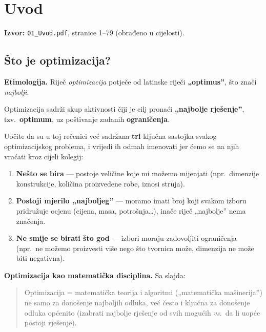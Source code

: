 \chapter{Uvod}
\label{ch:uvod}

\begin{izvor}
\textbf{Izvor:} \texttt{01\_Uvod.pdf}, stranice 1--79 (obrađeno u cijelosti).
\end{izvor}

\section{Što je optimizacija?}

\textbf{Etimologija.} Riječ \emph{optimizacija} potječe od latinske riječi
\textbf{„optimus”}, što znači \emph{najbolji}.

\begin{definicija}
Optimizacija sadrži skup aktivnosti čiji je cilj pronaći \textbf{„najbolje
rješenje”}, tzv.\ \textbf{optimum}, uz poštivanje zadanih \textbf{ograničenja}.
\end{definicija}

Uočite da su u toj rečenici već sadržana \textbf{tri} ključna sastojka svakog
optimizacijskog problema, i vrijedi ih odmah imenovati jer ćemo se na njih
vraćati kroz cijeli kolegij:

\begin{enumerate}
  \item \textbf{Nešto se bira} --- postoje veličine koje mi možemo mijenjati
        (npr.\ dimenzije konstrukcije, količina proizvedene robe, iznosi struja).
  \item \textbf{Postoji mjerilo „najboljeg”} --- moramo imati broj koji svakom
        izboru pridružuje ocjenu (cijena, masa, potrošnja\dots), inače riječ
        „najbolje” nema značenja.
  \item \textbf{Ne smije se birati što god} --- izbori moraju zadovoljiti
        ograničenja (npr.\ ne možemo proizvesti više nego što tvornica može,
        dimenzija ne može biti negativna).
\end{enumerate}

\textbf{Optimizacija kao matematička disciplina.} Sa slajda:

\begin{quote}
Optimizacija = matematička teorija i algoritmi („matematička mašinerija”) ne
samo za donošenje najboljih odluka, već često i ključna za donošenje odluka
općenito (izabrati najbolje rješenje od svih mogućih \emph{vs.}\ da li uopće
postoji rješenje).
\end{quote}

